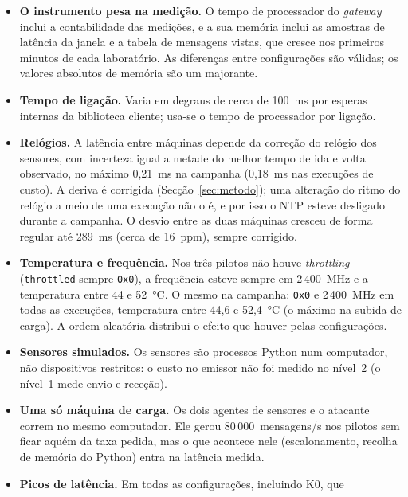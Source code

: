 \begin{itemize}[leftmargin=*]
  \item \textbf{O instrumento pesa na medição.} O tempo de processador do
    \emph{gateway} inclui a contabilidade das medições, e a sua memória inclui as
    amostras de latência da janela e a tabela de mensagens vistas, que cresce nos
    primeiros minutos de cada laboratório. As diferenças entre configurações são
    válidas; os valores absolutos de memória são um majorante.
  \item \textbf{Tempo de ligação.} Varia em degraus de cerca de 100~ms por esperas
    internas da biblioteca cliente; usa-se o tempo de processador por ligação.
  \item \textbf{Relógios.} A latência entre máquinas depende da correção do
    relógio dos sensores, com incerteza igual a metade do melhor tempo de ida e
    volta observado, no máximo 0,21~ms na campanha (0,18~ms nas execuções de
    custo).  A deriva é
    corrigida (Secção~\ref{sec:metodo}); uma alteração do ritmo do relógio a meio
    de uma execução não o é, e por isso o NTP esteve desligado durante a campanha.
    O desvio entre as duas máquinas cresceu de forma regular até 289~ms (cerca
    de 16~ppm), sempre corrigido.
  \item \textbf{Temperatura e frequência.} Nos três pilotos não houve
    \emph{throttling} (\texttt{throttled} sempre \texttt{0x0}), a frequência
    esteve sempre em 2\,400~MHz e a temperatura entre 44 e 52~°C. O mesmo na
    campanha: \texttt{0x0} e 2\,400~MHz em todas as execuções, temperatura entre
    44,6 e 52,4~°C (o máximo na subida de carga). A ordem aleatória distribui o
    efeito que houver pelas configurações.
  \item \textbf{Sensores simulados.} Os sensores são processos Python num
    computador, não dispositivos restritos: o custo no emissor não foi medido no
    nível~2 (o nível~1 mede envio e receção).
  \item \textbf{Uma só máquina de carga.} Os dois agentes de sensores e o atacante
    correm no mesmo computador. Ele gerou 80\,000~mensagens/s nos pilotos sem
    ficar aquém da taxa pedida, mas o que acontece nele (escalonamento, recolha de
    memória do Python) entra na latência medida.
  \item \textbf{Picos de latência.} Em todas as configurações, incluindo K0, que

\end{itemize}
